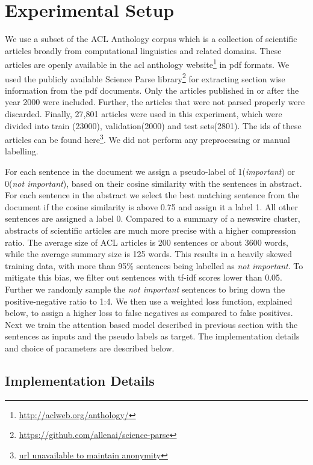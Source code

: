 \section{Experimental Setup}

We use a subset of the ACL Anthology corpus which is a collection of scientific articles broadly from computational linguistics and related domains. These articles are openly available in the acl anthology website\footnote{\url{http://aclweb.org/anthology/}} in pdf formats. We used the publicly available Science Parse library\footnote{\url{https://github.com/allenai/science-parse}} for extracting section wise information from the pdf documents. Only the articles published in or after the year 2000 were included. Further, the articles that were not parsed properly were discarded. Finally, 27,801 articles were used in this experiment, which were divided into train (23000), validation(2000) and test sets(2801). The ids of these articles can be found here\footnote{\url{url unavailable to maintain anonymity}}. We did not perform any preprocessing or manual labelling. 

For each sentence in the document we assign a pseudo-label of 1(\emph{important}) or 0(\emph{not important}), based on their cosine similarity with the sentences in abstract. For each sentence in the abstract we select the best matching sentence from the document if the cosine similarity is above 0.75 and assign it a label 1. All other sentences are assigned a label 0. Compared to a summary of a newswire cluster, abstracts of scientific articles are much more precise with a higher compression ratio. The average size of ACL articles is 200 sentences or about 3600 words, while the average summary size is 125 words. This results in a heavily skewed training data, with more than 95\% sentences being labelled as \emph{not important}. To mitigate this bias, we filter out sentences with tf-idf scores lower than 0.05. Further we randomly sample the \emph{not important} sentences to bring down the positive-negative ratio to 1:4. We then use a weighted loss function, explained below, to assign a higher loss to false negatives as compared to false positives. Next we train the attention based model described in previous section with the sentences as inputs and the pseudo labels as target. The implementation details and choice of parameters are described below.

\subsection{Implementation Details} 

